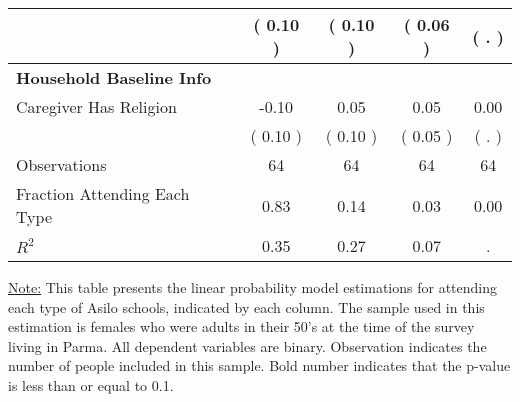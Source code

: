 \begin{table}[H]
{\begin{tabular}{lcccc}
\quad  & (     0.10 ) & (     0.10 )  & (     0.06 )  & (        . )  \\
\midrule
\textbf{Household Baseline Info} \\
\quad Caregiver Has Religion &     -0.10 &      0.05 &      0.05 &      0.00 \\
\quad  & (     0.10 ) & (     0.10 )  & (     0.05 )  & (        . )  \\
\midrule
Observations & 64 & 64 & 64 & 64 \\
Fraction Attending Each Type &      0.83 &      0.14 &      0.03 &      0.00 \\
\midrule
$ R^2$ &      0.35 &      0.27 &      0.07 &         . \\
\bottomrule
\end{tabular}}
\end{table}
\begin{footnotesize}
\noindent\underline{Note:} This table presents the linear probability model estimations for attending each type of Asilo schools, indicated by each column. The sample used in this estimation is females who were adults in their 50's at the time of the survey living in Parma. All dependent variables are binary. Observation indicates the number of people included in this sample. Bold number indicates that the p-value is less than or equal to 0.1.
\end{footnotesize}
